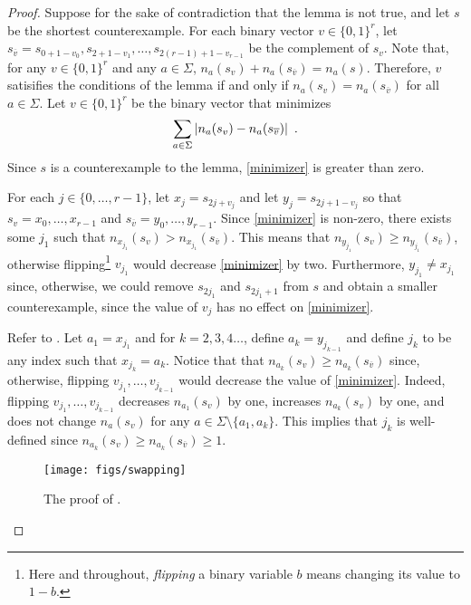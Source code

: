 \documentclass{llncs}
\begin{document}
\begin{proof}
  Suppose for the sake of contradiction that the lemma is not true, and
  let $s$ be the shortest counterexample.  For each binary vector $v\in\{0,1\}^{r}$, let
  $s_{\overline{v}}=s_{0+1-v_0},s_{2+1-v_1},\ldots,s_{2(r-1)+1-v_{r-1}}$
  be the complement of $s_v$.  Note that, for any $v\in\{0,1\}^{r}$
  and any $a\in\Sigma$, $n_a(s_v)+n_a(s_{\overline{v}})=n_a(s)$.
  Therefore, $v$ satisifies the conditions of the lemma if and
  only if $n_a(s_v)=n_a(s_{\overline{v}})$ for all $a\in\Sigma$.
  Let $v\in\{0,1\}^{r}$ be the binary vector that minimizes
  \begin{equation}\eqlabel{minimizer}
     \sum_{a\in\Sigma}|n_a(s_v)-n_a(s_{\overline{v}})| \enspace .
  \end{equation}
  Since $s$ is a counterexample to the lemma, \eqref{minimizer} is
  greater than zero.

  For each $j\in\{0,\ldots,r-1\}$, let $x_{j}=s_{2j+v_j}$ and
  let $y_j=s_{2j+1-v_j}$ so that $s_v=x_0,\ldots,x_{r-1}$ and
  $s_{\overline{v}}=y_0,\ldots,y_{r-1}$.  Since \eqref{minimizer}
  is non-zero, there exists some $j_1$ such that $n_{x_{j_1}}(s_v) >
  n_{x_{j_1}}(s_{\overline{v}})$.  This means that $n_{y_{j_1}}(s_v) \ge
  n_{y_{j_1}}(s_{\overline{v}})$, otherwise flipping\footnote{Here and
  throughout, \emph{flipping} a binary variable $b$ means changing its value to $1-b$.}
  $v_{j_1}$ would decrease \eqref{minimizer} by two.  Furthermore,
  $y_{j_1}\neq x_{j_1}$ since, otherwise, we could remove $s_{2j_1}$
  and $s_{2j_1+1}$ from $s$ and obtain a smaller counterexample, since
  the value of $v_j$ has no effect on \eqref{minimizer}.

  Refer to .
  Let $a_1=x_{j_1}$ and for $k=2,3,4\ldots$, define $a_k = y_{j_{k-1}}$
  and define $j_k$ to be any index such that $x_{j_k}=a_k$.  Notice that
  that $n_{a_k}(s_v)\ge n_{a_{k}}(s_{\overline{v}})$ since, otherwise,
  flipping $v_{j_1},\ldots,v_{j_{k-1}}$ would decrease the value of
  \eqref{minimizer}.  Indeed, flipping $v_{j_1},\ldots,v_{j_{k-1}}$
  decreases $n_{a_1}(s_v)$ by one, increases $n_{a_k}(s_v)$ by one, and
  does not change $n_a(s_v)$ for any $a\in\Sigma \setminus \{a_1,a_k\}$.
  This implies that $j_{k}$ is well-defined since
  $n_{a_k}(s_v)\ge n_{a_k}(s_{\overline{v}})\ge 1$.

  \begin{figure}
    \begin{center}
       \texttt{[image: figs/swapping]}
    \end{center}
    \caption{The proof of .}
  \end{figure}


\end{proof}
\end{document}
